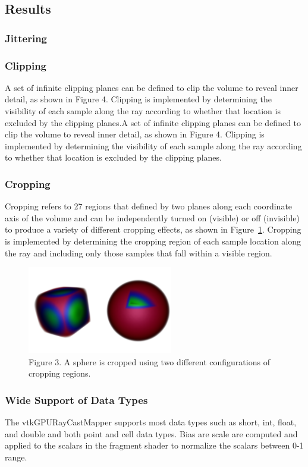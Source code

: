 \subsection{Results}

\subsubsection{Jittering}

\subsubsection{Clipping}
A set of infinite clipping planes can be defined to clip the volume to reveal inner detail, as shown in Figure 4.  Clipping is implemented by determining the visibility of each sample along the ray according to whether that location is excluded by the clipping planes.A set of infinite clipping planes can be defined to clip the volume to reveal inner detail, as shown in Figure 4.  Clipping is implemented by determining the visibility of each sample along the ray according to whether that location is excluded by the clipping planes.

\subsubsection{Cropping}
Cropping refers to 27 regions that defined by two planes along each coordinate axis of the volume and can be independently turned on (visible) or off (invisible) to produce a variety of different cropping effects, as shown in Figure~\ref{fig:cropping}. Cropping is implemented by determining the cropping region of each sample location along the ray and including only those samples that fall within a visible region.

\begin{figure}
\centering
\includegraphics[width=2.5in]{SphereCropping.png}
\caption{Figure 3. A sphere is cropped using two different configurations of cropping regions.}
\label{fig:cropping}
\end{figure}

\subsubsection{Wide Support of Data Types} 
The vtkGPURayCastMapper supports most data types such as short, int, float, and double and both point and cell data types. Bias are scale are computed and applied to the scalars in the fragment shader to normalize the scalars between 0-1 range. 

